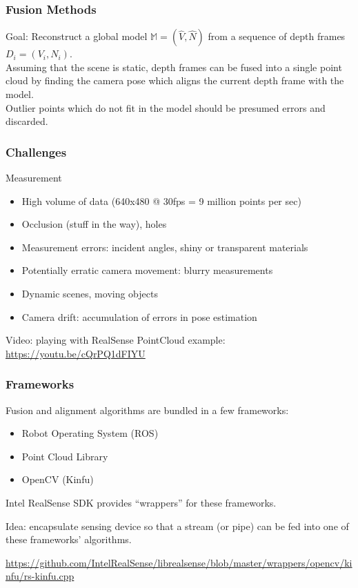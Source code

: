 \begin{frame}
\frametitle{Fusion Methods}
Goal: Reconstruct a global model $\mathbb{M} = (\hat{V}, \hat{N})$ from
a sequence of depth frames $D_i = (V_i, N_i)$. \\

Assuming that the scene is static, depth frames can be fused into a single
point cloud by finding the camera pose which aligns the current depth frame
with the model. \\

Outlier points which do not fit in the model should be presumed errors and discarded.
\end{frame}

\begin{frame}[allowframebreaks]
\frametitle{Challenges}
Measurement
\begin{itemize}
  \item High volume of data (640x480 @ 30fps = 9 million points per sec)
  \item Occlusion (stuff in the way), holes
  \item Measurement errors: incident angles, shiny or transparent materials
  \item Potentially erratic camera movement: blurry measurements
  \item Dynamic scenes, moving objects
  \item Camera drift: accumulation of errors in pose estimation
\end{itemize}
Video: playing with RealSense PointCloud example: \url{https://youtu.be/cQrPQ1dFIYU}
\end{frame}


\begin{frame}[allowframebreaks]
\frametitle{Frameworks}
Fusion and alignment algorithms are bundled in a few frameworks:
\begin{itemize}
  \item Robot Operating System (ROS)
  \item Point Cloud Library
  \item OpenCV (Kinfu)
\end{itemize}

Intel RealSense SDK provides ``wrappers'' for these frameworks.

Idea: encapsulate sensing device so that a stream (or pipe) can be fed into
one of these frameworks' algorithms.

\url{https://github.com/IntelRealSense/librealsense/blob/master/wrappers/opencv/kinfu/rs-kinfu.cpp}
\end{frame}
